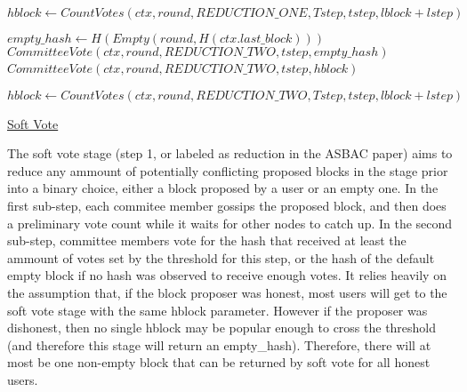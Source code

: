 \documentclass[10pt,a4paper]{article}
\begin{document}
\begin{algorithm}
    \begin{algorithmic}[H]
    
    \State $hblock \gets CountVotes(ctx, round, REDUCTION\_ONE, Tstep, tstep, lblock+lstep)$

    \State $empty\_hash \gets H(Empty(round, H(ctx.last\_block)))$ 
        \State $CommitteeVote(ctx, round, REDUCTION\_TWO, tstep, empty\_hash)$
    \Else
        {\State $CommitteeVote(ctx, round, REDUCTION\_TWO, tstep, hblock)$}
    \EndIf\

    \State $hblock \gets CountVotes(ctx, round, REDUCTION\_TWO, Tstep, tstep, lblock+lstep)$ 


    \EndFunction
    \end{algorithmic}
    \caption{\underline{Soft Vote}}
\end{algorithm}

The soft vote stage (step 1, or labeled as reduction in the ASBAC paper) aims to reduce any ammount of potentially conflicting proposed blocks in the stage prior into a binary choice, either a block proposed by a user or an empty one.
In the first sub-step, each commitee member gossips the proposed block, and then does a preliminary vote count while it waits for other nodes to catch up.
In the second sub-step, committee members vote for the hash that received at least the ammount of votes set by the threshold for this step, or the hash of the default empty block if no hash was observed to receive enough votes.
It relies heavily on the assumption that, if the block proposer was honest, most users will get to the soft vote stage with the same hblock parameter.
However if the proposer was dishonest, then no single hblock may be popular enough to cross the threshold (and therefore this stage will return an empty\_hash).
Therefore, there will at most be one non-empty block that can be returned by soft vote for all honest users.
\end{document}
